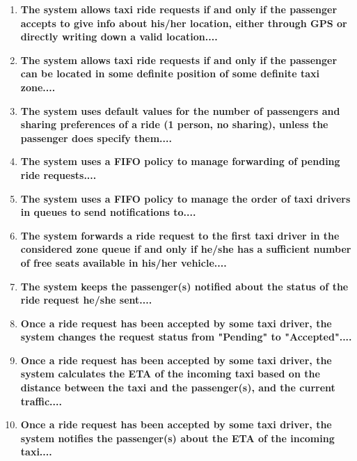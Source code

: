 \begin{enumerate}
	\item \textbf{The system allows taxi ride requests if and only if the passenger accepts
		to give info about his/her location, either through GPS or directly writing
		down a valid location....}\\
	
	\item \textbf{The system allows taxi ride requests if and only if the passenger can be
		located in some definite position of some definite taxi zone....}\\
	
	\item \textbf{The system uses default values for the number of passengers and sharing
		preferences of a ride (1 person, no sharing), unless the passenger does
		specify them....}\\
	
	\item \textbf{The system uses a FIFO policy to manage forwarding of pending ride
		requests....}\\
	
	\item \textbf{The system uses a FIFO policy to manage the order of taxi drivers in
		queues to send notifications to....}\\
	
	\item \textbf{The system forwards a ride request to the first taxi driver in the considered
		zone queue if and only if he/she has a sufficient number of free seats
		available in his/her vehicle....}\\
	
	\item \textbf{The system keeps the passenger(s) notified about the status of the ride
		request he/she sent....}\\
	
	\item \textbf{Once a ride request has been accepted by some taxi driver, the system
		changes the request status from "Pending" to "Accepted"....}\\
	
	\item \textbf{Once a ride request has been accepted by some taxi driver, the system
		calculates the ETA of the incoming taxi based on the distance between
		the taxi and the passenger(s), and the current traffic....}\\
	
	\item \textbf{Once a ride request has been accepted by some taxi driver, the system
		notifies the passenger(s) about the ETA of the incoming taxi....}\\
	

\end{enumerate}
